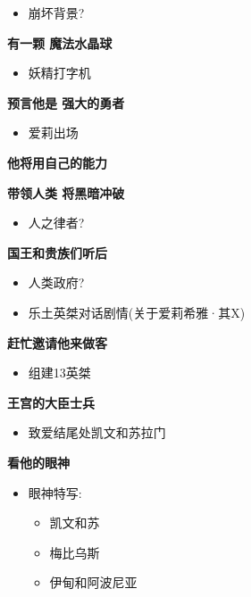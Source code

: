 \documentclass[a4paper]{article}
\begin{document}
\begin{itemize}
    \item 崩坏背景?
\end{itemize}

\textbf{有一颗 魔法水晶球}

\begin{itemize}
    \item 妖精打字机
\end{itemize}

\textbf{预言他是 强大的勇者}

\begin{itemize}
    \item 爱莉出场
\end{itemize}

\textbf{他将用自己的能力}

\textbf{带领人类 将黑暗冲破}

\begin{itemize}
    \item 人之律者?
\end{itemize}

\textbf{国王和贵族们听后}

\begin{itemize}
    \item 人类政府?
    \item 乐土英桀对话剧情(关于爱莉希雅·其X)
\end{itemize}

\textbf{赶忙邀请他来做客}

\begin{itemize}
    \item 组建13英桀
\end{itemize}

\textbf{王宫的大臣士兵}

\begin{itemize}
    \item 致爱结尾处凯文和苏拉门
\end{itemize}

\textbf{看他的眼神}

\begin{itemize}
    \item 眼神特写:
    \begin{itemize}
        \item 凯文和苏
        \item 梅比乌斯
        \item 伊甸和阿波尼亚
    \end{itemize}
\end{itemize}
\end{document}
